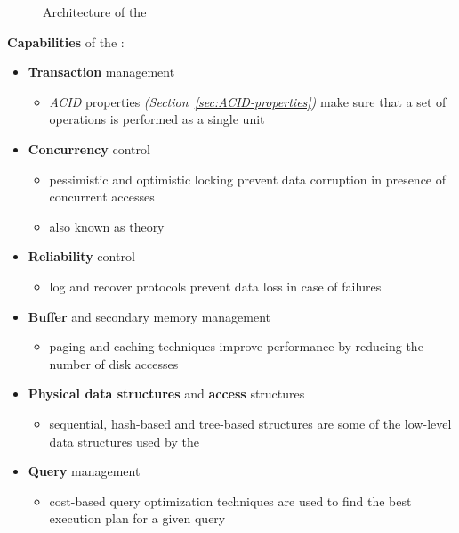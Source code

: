 \documentclass[english]{article}
\begin{document}
\begin{figure}[htbp]
  \centering
  \bigskip
  \bigskip
  \caption{Architecture of the \dbms}
  \label{fig:architecture}
\end{figure}

\bigskip
\textbf{Capabilities} of the \dbms:

\begin{itemize}
  \item \textbf{Transaction} management
        \begin{itemize}[label=\(\rightarrow\)]
          \item \textit{ACID} properties \textit{(Section~\ref{sec:ACID-properties})} make sure that a set of operations is performed as a single unit
        \end{itemize}
  \item \textbf{Concurrency} control
        \begin{itemize}[label=\(\rightarrow\)]
          \item pessimistic and optimistic locking prevent data corruption in presence of concurrent accesses
          \item also known as \cc theory
        \end{itemize}
  \item \textbf{Reliability} control
        \begin{itemize}[label=\(\rightarrow\)]
          \item log and recover protocols prevent data loss in case of failures
        \end{itemize}
  \item \textbf{Buffer} and secondary memory management
        \begin{itemize}[label=\(\rightarrow\)]
          \item paging and caching techniques improve performance by reducing the number of disk accesses
        \end{itemize}
  \item \textbf{Physical data structures} and \textbf{access} structures
        \begin{itemize}[label=\(\rightarrow\)]
          \item sequential, hash-based and tree-based structures are some of the low-level data structures used by the \dbms
        \end{itemize}
  \item \textbf{Query} management
        \begin{itemize}[label=\(\rightarrow\)]
          \item cost-based query optimization techniques are used to find the best execution plan for a given query
        \end{itemize}
\end{itemize}
\end{document}
